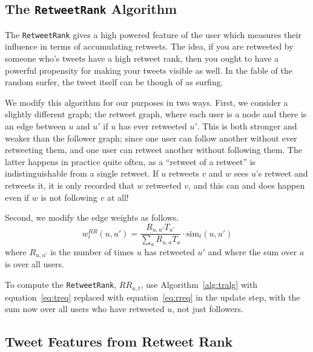 \subsection{The \texttt{RetweetRank} Algorithm}

The \texttt{RetweetRank} gives a high powered feature of the user which measures their influence in terms of accumulating retweets.  
The idea, if you are retweeted by someone who's tweets have a high retweet rank, then you ought to have a powerful propensity for making your tweets visible as well.
In the fable of the random surfer, the tweet itself can be though of as surfing.  

We modify this algorithm for our purposes in two ways.
First, we consider a slightly different graph; the retweet graph, where each user is a node and there is an edge between $u$ and $u'$ if $u$ has ever retweeted $u'$.
This is both stronger and weaker than the follower graph; since one user can follow another without ever retweeting them, and one user can retweet another without following them.
The latter happens in practice quite often, as a ``retweet of a retweet'' is indistinguishable from a single retweet.
If $u$ retweets $v$ and $w$ sees $u$'s retweet and retweets it, it is only recorded that $w$ retweeted $v$, and this can and does happen even if $w$ is not following $v$ at all!

Second, we modify the edge weights as follows.
\begin{equation}\label{eq:rreq}
w^{RR}_t(u,u') = \frac{R_{u,u'}T_{u'}}{\sum_a R_{u,a}T_{a}}\cdot \mbox{sim}_t(u,u')
\end{equation}
where $R_{u,u'}$ is the number of times $u$ has retweeted $u'$ and where the sum over $a$ is over all users.  

To compute the \texttt{RetweetRank}, $RR_{u,t}$, use Algorithm~\ref{alg:tralg} with equation~\eqref{eq:treq} replaced with equation~\eqref{eq:rreq} in the update step, with the sum now over all users who have retweeted $u$, not just followers.  

\subsection{Tweet Features from Retweet Rank}


